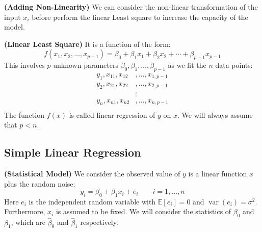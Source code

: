\begin{remark}{\textbf{(Adding Non-Linearity)}}
    We can consider the non-linear transformation of the input $x_i$ before perform the linear Least square to increase the capacity of the model. 
\end{remark}

\begin{definition}{\textbf{(Linear Least Square)}}
    It is a function of the form:
    \begin{equation*}
        f(x_1,x_2,\dots,x_{p-1}) = \beta_0 + \beta_1x_1 + \beta_2x_2 + \cdots + \beta_{p-1}x_{p-1}
    \end{equation*}
    This involves $p$ unknown parameters $\beta_0, \beta_1,\dots,\beta_{p-1}$ as we fit the $n$ data points:
    \begin{equation*}
    \begin{aligned}
        y_1, x_{11}, x_{12}&,\dots,x_{1,p-1} \\
        y_2, x_{21}, x_{22}&,\dots,x_{2,p-1} \\
        &\vdots \\
        y_n, x_{n1}, x_{n2}&,\dots,x_{n,p-1} \\
    \end{aligned}
    \end{equation*}
    The function $f(x)$ is called linear regression of $y$ on $x$. We will always assume that $p < n$.
\end{definition}

\subsection{Simple Linear Regression}

\begin{definition}{\textbf{(Statistical Model)}}
    We consider the observed value of $y$ is a linear function $x$ plus the random noise:
    \begin{equation*}
        y_i = \beta_0 + \beta_1 x_i + e_i \qquad i =1,\dots,n
    \end{equation*}
    Here $e_i$ is the independent random variable with $\mathbb{E}[e_i] = 0$ and $\operatorname{var}(e_i) = \sigma^2$. Furthermore, $x_i$ is assumed to be fixed. We will consider the statistics of $\beta_0$ and $\beta_1$, which are $\hat{\beta}_0$ and $\hat{\beta}_1$ respectively. 
\end{definition}

